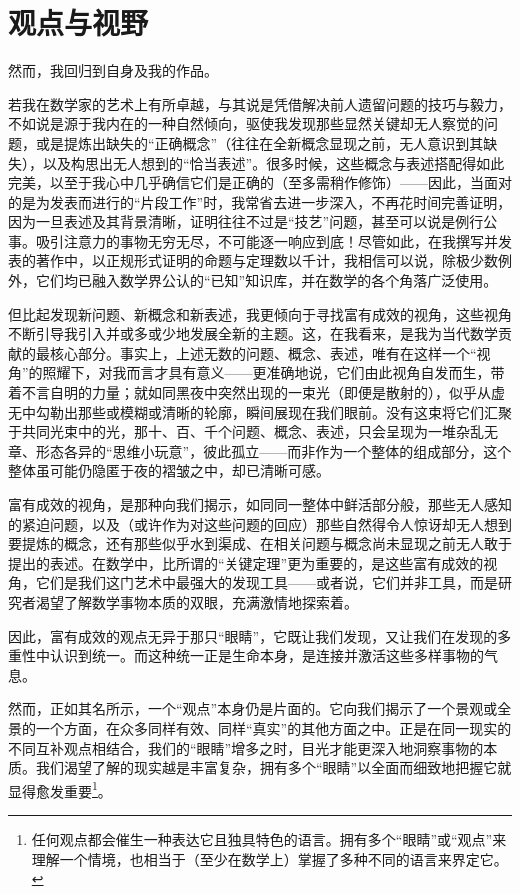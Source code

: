 
\section{观点与视野}

然而，我回归到自身及我的作品。

若我在数学家的艺术上有所卓越，与其说是凭借解决前人遗留问题的技巧与毅力，不如说是源于我内在的一种自然倾向，驱使我发现那些显然关键却无人察觉的问题，或是提炼出缺失的“正确概念”（往往在全新概念显现之前，无人意识到其缺失），以及构思出无人想到的“恰当表述”。很多时候，这些概念与表述搭配得如此完美，以至于我心中几乎确信它们是正确的（至多需稍作修饰）——因此，当面对的是为发表而进行的“片段工作”时，我常省去进一步深入，不再花时间完善证明，因为一旦表述及其背景清晰，证明往往不过是“技艺”问题，甚至可以说是例行公事。吸引注意力的事物无穷无尽，不可能逐一响应到底！尽管如此，在我撰写并发表的著作中，以正规形式证明的命题与定理数以千计，我相信可以说，除极少数例外，它们均已融入数学界公认的“已知”知识库，并在数学的各个角落广泛使用。

但比起发现新问题、新概念和新表述，我更倾向于寻找富有成效的视角，这些视角不断引导我引入并或多或少地发展全新的主题。这，在我看来，是我为当代数学贡献的最核心部分。事实上，上述无数的问题、概念、表述，唯有在这样一个“视角”的照耀下，对我而言才具有意义——更准确地说，它们由此视角自发而生，带着不言自明的力量；就如同黑夜中突然出现的一束光（即便是散射的），似乎从虚无中勾勒出那些或模糊或清晰的轮廓，瞬间展现在我们眼前。没有这束将它们汇聚于共同光束中的光，那十、百、千个问题、概念、表述，只会呈现为一堆杂乱无章、形态各异的“思维小玩意”，彼此孤立——而非作为一个整体的组成部分，这个整体虽可能仍隐匿于夜的褶皱之中，却已清晰可感。

富有成效的视角，是那种向我们揭示，如同同一整体中鲜活部分般，那些无人感知的紧迫问题，以及（或许作为对这些问题的回应）那些自然得令人惊讶却无人想到要提炼的概念，还有那些似乎水到渠成、在相关问题与概念尚未显现之前无人敢于提出的表述。在数学中，比所谓的“关键定理”更为重要的，是这些富有成效的视角，它们是我们这门艺术中最强大的发现工具——或者说，它们并非工具，而是研究者渴望了解数学事物本质的双眼，充满激情地探索着。

因此，富有成效的观点无异于那只“眼睛”，它既让我们发现，又让我们在发现的多重性中认识到统一。而这种统一正是生命本身，是连接并激活这些多样事物的气息。

然而，正如其名所示，一个“观点”本身仍是片面的。它向我们揭示了一个景观或全景的一个方面，在众多同样有效、同样“真实”的其他方面之中。正是在同一现实的不同互补观点相结合，我们的“眼睛”增多之时，目光才能更深入地洞察事物的本质。我们渴望了解的现实越是丰富复杂，拥有多个“眼睛”以全面而细致地把握它就显得愈发重要\footnote{任何观点都会催生一种表达它且独具特色的语言。拥有多个“眼睛”或“观点”来理解一个情境，也相当于（至少在数学上）掌握了多种不同的语言来界定它。}。


